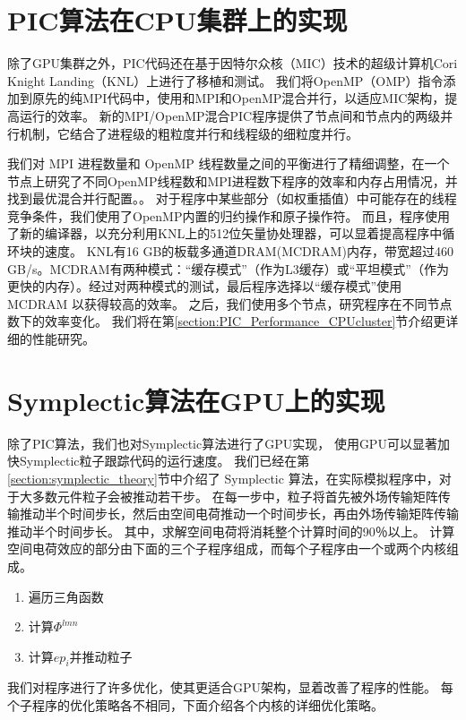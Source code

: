 \section{PIC算法在CPU集群上的实现}        \label{section:PIC_Code_CPUcluster}
除了GPU集群之外，PIC代码还在基于因特尔众核（MIC）技术的超级计算机Cori Knight Landing（KNL）上进行了移植和测试。
我们将OpenMP（OMP）指令添加到原先的纯MPI代码中，使用和MPI和OpenMP混合并行，以适应MIC架构，提高运行的效率。
新的MPI/OpenMP混合PIC程序提供了节点间和节点内的两级并行机制，它结合了进程级的粗粒度并行和线程级的细粒度并行。

我们对 MPI 进程数量和 OpenMP 线程数量之间的平衡进行了精细调整，在一个节点上研究了不同OpenMP线程数和MPI进程数下程序的效率和内存占用情况，并找到最优混合并行配置。。
对于程序中某些部分（如权重插值）中可能存在的线程竞争条件，我们使用了OpenMP内置的归约操作和原子操作符。
而且，程序使用了新的编译器，以充分利用KNL上的512位矢量协处理器，可以显着提高程序中循环块的速度。
KNL有16 GB的板载多通道DRAM(MCDRAM)内存，带宽超过460 GB/s。MCDRAM有两种模式：“缓存模式”（作为L3缓存）或“平坦模式”（作为更快的内存）。经过对两种模式的测试，最后程序选择以“缓存模式”使用 MCDRAM 以获得较高的效率。
之后，我们使用多个节点，研究程序在不同节点数下的效率变化。
我们将在第\ref{section:PIC_Performance_CPUcluster}节介绍更详细的性能研究。

\section{Symplectic算法在GPU上的实现}     \label{section:symplectic_GPU}
除了PIC算法，我们也对Symplectic算法进行了GPU实现，
使用GPU可以显著加快Symplectic粒子跟踪代码的运行速度。
我们已经在第\ref{section:symplectic_theory}节中介绍了 Symplectic 算法，在实际模拟程序中，对于大多数元件粒子会被推动若干步。
在每一步中，粒子将首先被外场传输矩阵传输推动半个时间步长，然后由空间电荷推动一个时间步长，再由外场传输矩阵传输推动半个时间步长。
其中，求解空间电荷将消耗整个计算时间的90％以上。 计算空间电荷效应的部分由下面的三个子程序组成，而每个子程序由一个或两个内核组成。
\begin{enumerate}
  \item 遍历三角函数
  \item 计算$\Phi^{lmn}$
  \item 计算$ep_i$并推动粒子
\end{enumerate}

我们对程序进行了许多优化，使其更适合GPU架构，显着改善了程序的性能。 每个子程序的优化策略各不相同，下面介绍各个内核的详细优化策略。
